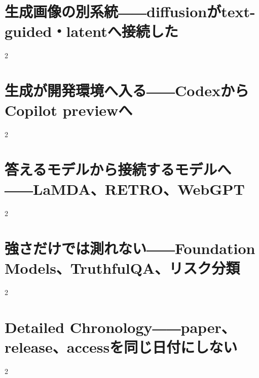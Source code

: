 \documentclass[lualatex,a4paper,11pt]{jlreq}
\begin{document}
\clearpage
\section{生成画像の別系統――diffusionがtext-guided・latentへ接続した}
\label{pkg:diffusion-media}

\medskip
\begin{multicols}{2}

\end{multicols}


\clearpage
\section{生成が開発環境へ入る――CodexからCopilot previewへ}
\label{pkg:code-developer-interface}

\medskip
\begin{multicols}{2}

\end{multicols}


\clearpage
\section{答えるモデルから接続するモデルへ――LaMDA、RETRO、WebGPT}
\label{pkg:dialogue-retrieval-grounding}

\medskip
\begin{multicols}{2}

\end{multicols}


\clearpage
\section{強さだけでは測れない――Foundation Models、TruthfulQA、リスク分類}
\label{pkg:evaluation-risk-foundation}

\medskip
\begin{multicols}{2}

\end{multicols}


\clearpage
\section{Detailed Chronology――paper、release、accessを同じ日付にしない}
\label{pkg:annual-chronology}

\medskip
\begin{multicols}{2}

\end{multicols}

\end{document}
